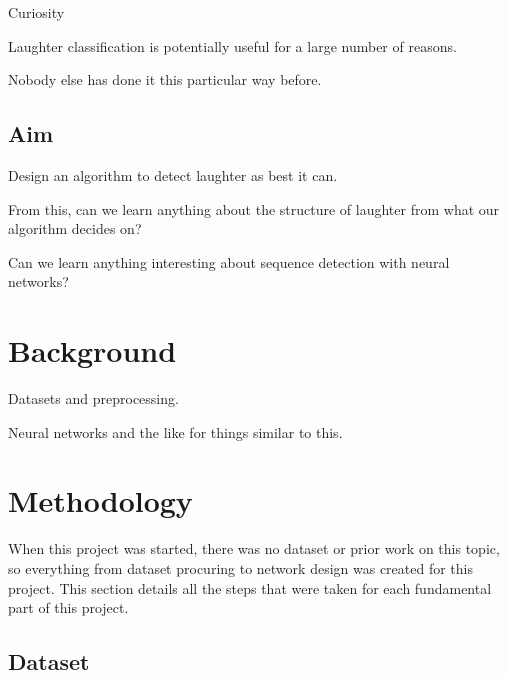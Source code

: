 \documentclass[a4paper,11pt,notitlepage]{article}
\begin{document}
Curiosity

Laughter classification is potentially useful for a large number of reasons.

Nobody else has done it this particular way before.

\subsection{Aim}


Design an algorithm to detect laughter as best it can.

From this, can we learn anything about the structure of laughter from what our algorithm decides on?

Can we learn anything interesting about sequence detection with neural networks?

\section{Background}


Datasets and preprocessing.

Neural networks and the like for things similar to this.

\section{Methodology}


When this project was started, there was no dataset or prior work on this topic, so everything from dataset procuring to network design was created for this project. This section details all the steps that were taken for each fundamental part of this project.

\subsection{Dataset}

\end{document}
